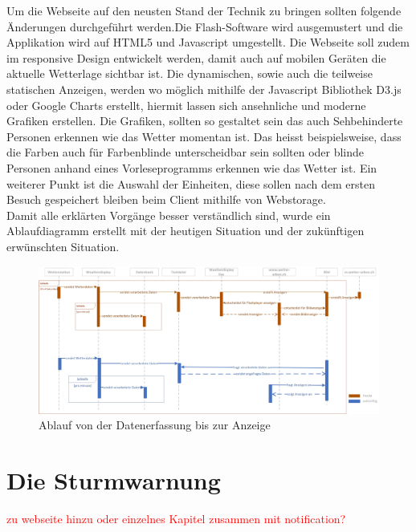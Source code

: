 \documentclass[a4paper,ngerman, 11pt, pagesize]{report}
\newcommand\Diskussionspunkt[1]{\textcolor{red}{#1}}
\begin{document}
Um die Webseite auf den neusten Stand der Technik zu bringen sollten folgende Änderungen durchgeführt werden.Die Flash-Software wird ausgemustert und die Applikation wird auf HTML5 und Javascript umgestellt. Die Webseite soll zudem im responsive Design entwickelt werden, damit auch auf mobilen Geräten die aktuelle Wetterlage sichtbar ist. Die dynamischen, sowie auch die teilweise statischen Anzeigen, werden wo möglich mithilfe der Javascript Bibliothek D3.js oder Google Charts erstellt, hiermit lassen sich ansehnliche und moderne Grafiken erstellen. Die Grafiken, sollten so gestaltet sein das auch Sehbehinderte Personen erkennen wie das Wetter momentan ist. Das heisst beispielsweise, dass die Farben auch für Farbenblinde unterscheidbar sein sollten oder blinde Personen anhand eines Vorleseprogramms erkennen wie das Wetter ist. Ein weiterer Punkt ist die Auswahl der Einheiten, diese sollen nach dem ersten Besuch gespeichert bleiben beim Client mithilfe von Webstorage.  \\
Damit alle erklärten Vorgänge besser verständlich sind, wurde ein Ablaufdiagramm erstellt mit der heutigen Situation und der zukünftigen erwünschten Situation.
\begin{landscape}
\begin{figure}[htbp]
	\centering
	\includegraphics[width=1\linewidth]{img/Sequenzdiagramm_Wetter}
	\caption{Ablauf von der Datenerfassung bis zur Anzeige}
	\label{img:Sequenzdiagramm}
\end{figure}
\end{landscape}
\section{Die Sturmwarnung}\Diskussionspunkt{zu webseite hinzu oder einzelnes Kapitel zusammen mit notification?}
\end{document}
